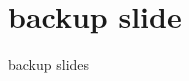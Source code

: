 \graphicspath{{./figures/}}
\title{}
\date{}

\begin{frame}
    \titlepage
\end{frame}



\section{backup slide}
\begin{frame}{}
\end{frame}
\begin{frame}{backup slides}
\end{frame}


